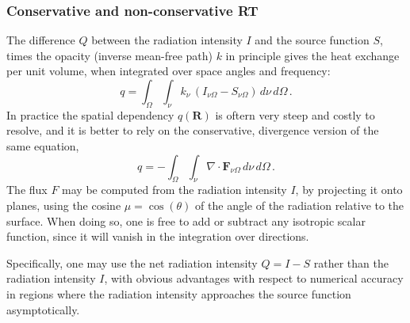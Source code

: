 \documentclass[paper=a4,fontsize=11pt]{scrartcl}
\numberwithin{equation}{section}		%
\numberwithin{figure}{section}			%
\numberwithin{table}{section}				%
\begin{document}
\subsubsection{Conservative and non-conservative RT}
The difference $Q$ between the radiation intensity $I$ and the source function $S$, times the opacity (inverse mean-free path) $k$ in principle gives the heat exchange per unit volume, when integrated over space angles and frequency:
\begin{equation}
    q = \int_\Omega\int_\nu k_{\nu} \, (I_{\nu\Omega}-S_{\nu\Omega}) \,d\nu \,d\Omega \,.
\end{equation}
In practice the spatial dependency $q(\mathbf{R})$ is oftern very steep and costly to resolve, and it is better to rely on the conservative, divergence version of the same equation,
\begin{equation}
    q = -\int_\Omega\int_\nu \nabla \cdot \mathbf{F}_{\nu\Omega}\,d\nu \,d\Omega \,.
\end{equation}
The flux $F$ may be computed from the radiation intensity $I$, by projecting it onto planes, using the cosine $\mu=\cos(\theta)$ of the angle of the radiation relative to the surface. When doing so, one is free to add or subtract any isotropic scalar function, since it will vanish in the integration over directions.

Specifically, one may use the net radiation intensity $Q=I-S$ rather than the radiation intensity $I$, with obvious advantages with respect to numerical accuracy in regions where the radiation intensity approaches the source function asymptotically.

\def\dtau{\Delta\tau}
\def\extau{{e^{-\Delta\tau}}}
\def\extau1{1-e^{-\dtau}}
\end{document}
